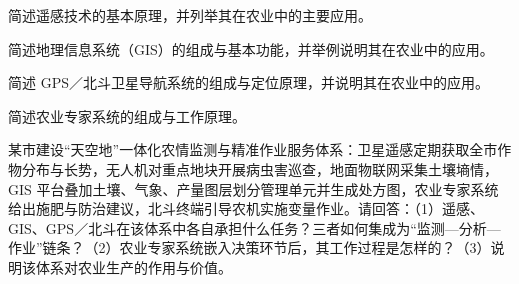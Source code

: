 \documentclass[a4paper,11pt]{article}
\begin{document}
\newpage
{}
\q 简述遥感技术的基本原理，并列举其在农业中的主要应用。\anslines{2.4cm}

\q 简述地理信息系统（GIS）的组成与基本功能，并举例说明其在农业中的应用。\anslines{2.4cm}

\q 简述 GPS／北斗卫星导航系统的组成与定位原理，并说明其在农业中的应用。\anslines{2.4cm}

\q 简述农业专家系统的组成与工作原理。\anslines{2.4cm}

\newpage
{}
\q 某市建设“天空地”一体化农情监测与精准作业服务体系：卫星遥感定期获取全市作物分布与长势，无人机对重点地块开展病虫害巡查，地面物联网采集土壤墒情，GIS 平台叠加土壤、气象、产量图层划分管理单元并生成处方图，农业专家系统给出施肥与防治建议，北斗终端引导农机实施变量作业。请回答：（1）遥感、GIS、GPS／北斗在该体系中各自承担什么任务？三者如何集成为“监测—分析—作业”链条？（2）农业专家系统嵌入决策环节后，其工作过程是怎样的？（3）说明该体系对农业生产的作用与价值。\anslines{6cm}
\end{document}
